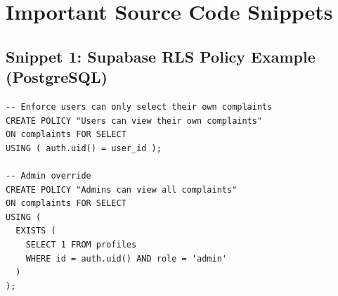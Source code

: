\documentclass[11pt, a4paper]{report}
\begin{document}
\appendix
\chapter{Important Source Code Snippets}

\section*{Snippet 1: Supabase RLS Policy Example (PostgreSQL)}
\begin{verbatim}
-- Enforce users can only select their own complaints
CREATE POLICY "Users can view their own complaints"
ON complaints FOR SELECT
USING ( auth.uid() = user_id );

-- Admin override
CREATE POLICY "Admins can view all complaints"
ON complaints FOR SELECT
USING ( 
  EXISTS (
    SELECT 1 FROM profiles 
    WHERE id = auth.uid() AND role = 'admin'
  )
);
\end{verbatim}

\vspace{1cm}
\end{document}
